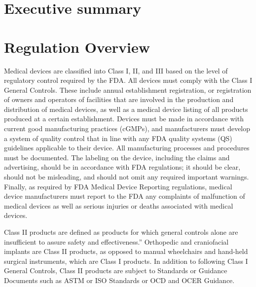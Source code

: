\documentclass{article}
\begin{document}

\setcounter{tocdepth}{3}
\tableofcontents
\newpage

\section*{Executive summary}
\label{sec:exec-summary}

\section{Regulation Overview}
\label{sec:test-administration}

Medical devices are classified into Class I, II, and III based on the
level of regulatory control required by the FDA. All devices must
comply with the Class I General Controls. These include annual
establishment registration, or registration of owners and operators of
facilities that are involved in the production and distribution of
medical devices, as well as a medical device listing of all products
produced at a certain establishment. Devices must be made in
accordance with current good manufacturing practices (cGMPs), and
manufacturers must develop a system of quality control that in line
with any FDA quality systems (QS) guidelines applicable to their
device. All manufacturing processes and procedures must be
documented. The labeling on the device, including the claims and
advertising, should be in accordance with FDA regulations; it should
be clear, should not be misleading, and should not omit any required
important warnings. Finally, as required by FDA Medical Device
Reporting regulations, medical device manufacturers must report to the
FDA any complaints of malfunction of medical devices as well as
serious injuries or deaths associated with medical devices.

Class II products are defined as products for which general controls
alone are insufficient to assure safety and effectiveness.” Orthopedic
and craniofacial implants are Class II products, as opposed to manual
wheelchairs and hand-held surgical instruments, which are Class I
products.  In addition to following Class I General Controls, Class II
products are subject to Standards or Guidance Documents such as ASTM
or ISO Standards or OCD and OCER Guidance.
\end{document}
